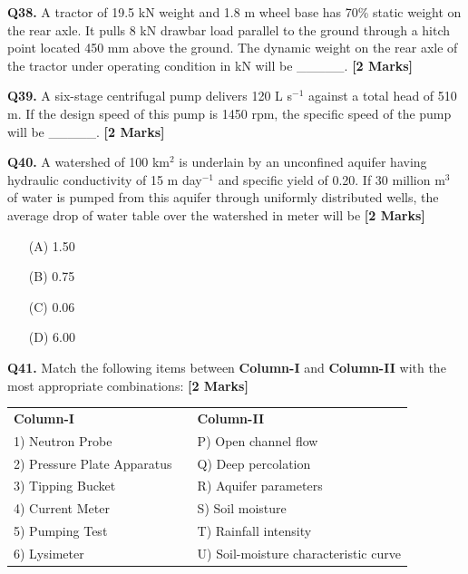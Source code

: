 \documentclass[11pt]{article}
\newcommand{\questionb}[2]{
    \noindent\textbf{Q#2.} #1 \hfill \textbf{[2 Marks]}
}
\begin{document}
\vspace{0.5cm}

\questionb{A tractor of 19.5 kN weight and 1.8 m wheel base has 70\% static weight on the rear axle. It pulls 8 kN drawbar load parallel to the ground through a hitch point located 450 mm above the ground. The dynamic weight on the rear axle of the tractor under operating condition in kN will be \_\_\_\_\_.}{38}

\vspace{0.5cm}

\questionb{A six-stage centrifugal pump delivers 120 L s$^{-1}$ against a total head of 510 m. If the design speed of this pump is 1450 rpm, the specific speed of the pump will be \_\_\_\_\_.}{39}

\vspace{0.5cm}

\questionb{A watershed of 100 km$^2$ is underlain by an unconfined aquifer having hydraulic conductivity of 15 m day$^{-1}$ and specific yield of 0.20. If 30 million m$^3$ of water is pumped from this aquifer through uniformly distributed wells, the average drop of water table over the watershed in meter will be}{40}
\begin{enumerate}
    \item[(A)] 1.50
    \item[(B)] 0.75
    \item[(C)] 0.06
    \item[(D)] 6.00
\end{enumerate}

\vspace{0.5cm}

\questionb{Match the following items between \textbf{Column-I} and \textbf{Column-II} with the most appropriate combinations:}{41}

\begin{tabularx}{\linewidth}{lXl}
\textbf{Column-I} & & \textbf{Column-II} \\
1) Neutron Probe & & P) Open channel flow \\
2) Pressure Plate Apparatus & & Q) Deep percolation \\
3) Tipping Bucket & & R) Aquifer parameters \\
4) Current Meter & & S) Soil moisture \\
5) Pumping Test & & T) Rainfall intensity \\
6) Lysimeter & & U) Soil-moisture characteristic curve \\
\end{tabularx}
\end{document}
